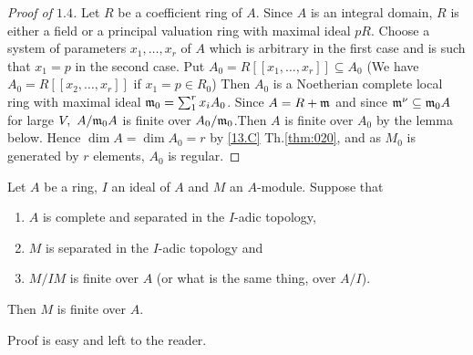 \documentclass[../main]{subfiles}
\begin{document}
\begin{proof}[Proof of $1.4$] Let $R$ be a coefficient ring of $A$. Since $A$ is an integral domain, $R$ is either a field or a principal valuation ring with maximal ideal $pR$. Choose a system of parameters $x_1, \ldots, x_r$ of $A$ which is arbitrary in the first case and is such that $x_1=p$ in the second case. Put $A_0=R[[x_1, \ldots,x_r]] \subseteq A_0$ (We have $A_0=R[[x_2, \ldots, x_r]]$ if $x_1=p \in R_0$) Then $A_0$ is a Noetherian complete local ring with maximal ideal $\mathfrak{m}_0=\sum_1^r x_i A_0$. Since $A=R+\mathfrak{m}$ and since $\mathfrak{m}^\nu \subseteq \mathfrak{m}_0 A$ for large $V, ~A/\mathfrak{m}_0A$ is finite over $A_0 / \mathfrak{m}_0$.Then $A$ is finite over $A_0$ by the lemma below. Hence $\dim A=\dim A_0=r$ by \ref{13.C} Th.\ref{thm:020}, and as $M_0$ is generated by $r$ elements, $A_0$ is regular.
\end{proof}

\begin{lemma}\label{lem:28.02}
Let $A$ be a ring, $I$ an ideal of $A$ and $M$ an $A$-module. Suppose that 
\begin{enumerate}[label = (\alph*)]
    \item $A$ is complete and separated in the $I$-adic topology,
    \item $M$ is separated in the $I$-adic topology and
    \item $M/IM$ is finite over $A$ (or what is the same thing, over $A/I$).
\end{enumerate}
 Then $M$ is finite over $A$.
\end{lemma} 

Proof is easy and left to the reader.
\end{document}
